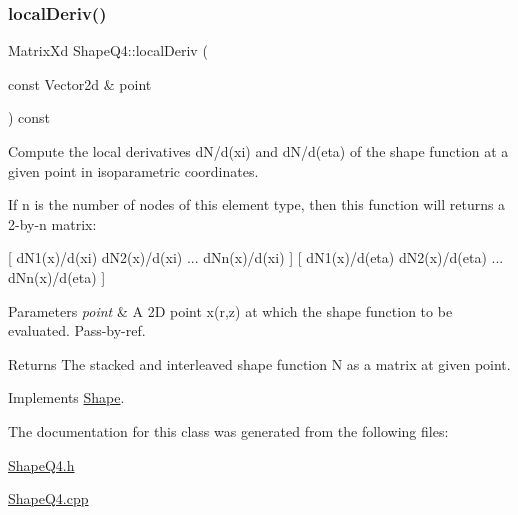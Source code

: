\mbox{\label{class_shape_q4_ad3e1f5e25aee96cd21b1c8770c35afd0}} 
\subsubsection{\texorpdfstring{local\+Deriv()}{localDeriv()}}
{\footnotesize\ttfamily Matrix\+Xd Shape\+Q4\+::local\+Deriv (\begin{DoxyParamCaption}\item[{const Vector2d \&}]{point }\end{DoxyParamCaption}) const\hspace{0.3cm}{\ttfamily [virtual]}}



Compute the local derivatives d\+N/d(xi) and d\+N/d(eta) of the shape function at a given point in isoparametric coordinates. 

If n is the number of nodes of this element type, then this function will returns a 2-\/by-\/n matrix\+:

\mbox{[} d\+N1(x)/d(xi) d\+N2(x)/d(xi) ... d\+Nn(x)/d(xi) \mbox{]} \mbox{[} d\+N1(x)/d(eta) d\+N2(x)/d(eta) ... d\+Nn(x)/d(eta) \mbox{]}


\begin{DoxyParams}{Parameters}
{\em point} & A 2D point x(r,z) at which the shape function to be evaluated. Pass-\/by-\/ref. \\
\hline
\end{DoxyParams}
\begin{DoxyReturn}{Returns}
The stacked and interleaved shape function N as a matrix at given point. 
\end{DoxyReturn}


Implements \mbox{\hyperlink{class_shape_a55575394f656e3ee4b5ac37ea04af8c9}{Shape}}.



The documentation for this class was generated from the following files\+:\begin{DoxyCompactItemize}
\item 
\mbox{\hyperlink{_shape_q4_8h}{Shape\+Q4.\+h}}\item 
\mbox{\hyperlink{_shape_q4_8cpp}{Shape\+Q4.\+cpp}}\end{DoxyCompactItemize}
